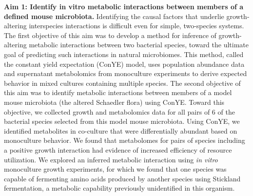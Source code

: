 \documentclass[11pt,onecolumn,notitlepage,openany,twoside]{book}
\begin{document}
\begin{refsection}
\textbf{Aim 1: Identify in vitro metabolic interactions between members of a defined mouse microbiota.} Identifying the causal factors that underlie growth-altering interspecies interactions is difficult even for simple, two-species systems. The first objective of this aim was to develop a method for inference of growth-altering metabolic interactions between two bacterial species, toward the ultimate goal of predicting such interactions in natural microbiomes. This method, called the constant yield expectation (ConYE) model, uses population abundance data and supernatant metabolomics from monoculture experiments to derive expected behavior in mixed cultures containing multiple species. The second objective of this aim was to identify metabolic interactions between members of a model mouse microbiota (the altered Schaedler flora) using ConYE. Toward this objective, we collected growth and metabolomics data for all pairs of 6 of the bacterial species selected from this model mouse microbiota. Using ConYE, we identified metabolites in co-culture that were differentially abundant based on monoculture behavior. We found that metabolomes for pairs of species including a positive growth interaction had evidence of increased efficiency of resource utilization. We explored an inferred metabolic interaction using \textit{in vitro} monoculture growth experiments, for which we found that one species was capable of fermenting amino acids produced by another species using Stickland fermentation, a metabolic capability previously unidentified in this organism. \\[12pt]



\end{refsection}
\end{document}
